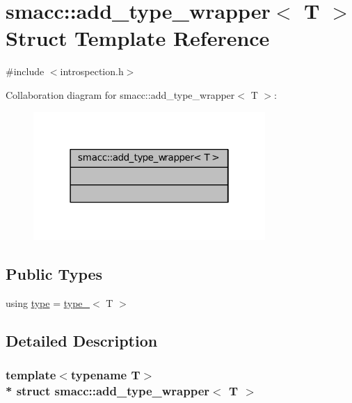 \hypertarget{structsmacc_1_1add__type__wrapper}{}\section{smacc\+:\+:add\+\_\+type\+\_\+wrapper$<$ T $>$ Struct Template Reference}
\label{structsmacc_1_1add__type__wrapper}


{\ttfamily \#include $<$introspection.\+h$>$}



Collaboration diagram for smacc\+:\+:add\+\_\+type\+\_\+wrapper$<$ T $>$\+:
\nopagebreak
\begin{figure}[H]
\begin{center}
\leavevmode
\includegraphics[width=250pt]{structsmacc_1_1add__type__wrapper__coll__graph}
\end{center}
\end{figure}
\subsection*{Public Types}
\begin{DoxyCompactItemize}
\item 
using \hyperlink{structsmacc_1_1add__type__wrapper_a3e5af90e35b5a70d9c4d952ef8011da9}{type} = \hyperlink{structsmacc_1_1type__}{type\+\_\+}$<$ T $>$
\end{DoxyCompactItemize}


\subsection{Detailed Description}
\subsubsection*{template$<$typename T$>$\\*
struct smacc\+::add\+\_\+type\+\_\+wrapper$<$ T $>$}



